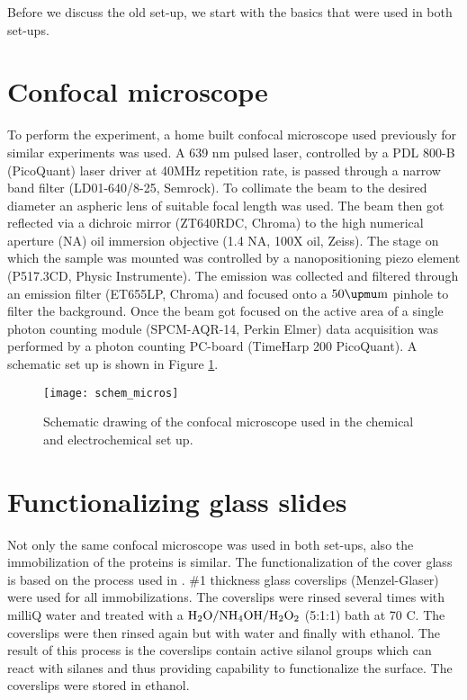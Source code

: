 \documentclass[twoside,single]{lion-msc}
\begin{document}
Before we discuss the old set-up, we start with the basics that were used in both set-ups.  

\section*{Confocal microscope}  \label{confo_micro}
To perform the experiment, a home built confocal microscope used previously for similar experiments \cite{Gupta2014} was used. A 639 nm pulsed laser, controlled by a PDL 800-B (PicoQuant) laser driver at 40MHz repetition rate, is passed through a narrow band filter (LD01-640/8-25, Semrock). To collimate the beam to the desired diameter an aspheric lens of suitable focal length was used. The beam then got reflected via a dichroic mirror (ZT640RDC, Chroma) to the high numerical aperture (NA) oil immersion objective (1.4 NA, 100X oil, Zeiss). The stage on which the sample was mounted was controlled by a nanopositioning piezo element (P517.3CD, Physic Instrumente). The emission was collected and filtered through an emission filter (ET655LP, Chroma) and focused onto a $50\upmu \textup{m}$ pinhole to filter the background. Once the beam got focused on the active area of a single photon counting module (SPCM-AQR-14, Perkin Elmer) data acquisition was performed by a photon counting PC-board (TimeHarp 200 PicoQuant). A schematic set up is shown in Figure \ref{micros}.

\begin{figure}[ht!]
\centering
\texttt{[image: schem\_micros]}
\caption{Schematic drawing of the confocal microscope used in the chemical and electrochemical set up.}
\label{micros}
\end{figure}


\section*{Functionalizing glass slides}
Not only the same confocal microscope was used in both set-ups, also the immobilization of the proteins is similar. The functionalization of the cover glass is based on the process used in \cite{Gupta2014}.  \diameter 25mm \#1 thickness glass coverslips (Menzel-Glaser) were used for all immobilizations. The coverslips were rinsed several times with milliQ water and treated with a  $\textup{H}_{2}\textup{O} / \textup{NH}_{4}\textup{OH} / \textup{H}_{2}\textup{O}_{2}$ (5:1:1) bath at 70 \degree C. The coverslips were then rinsed again but with water and finally with ethanol. The result of this process is the coverslips contain active silanol groups which can react with silanes and thus providing capability to functionalize the surface. The coverslips were stored in ethanol.
\end{document}
